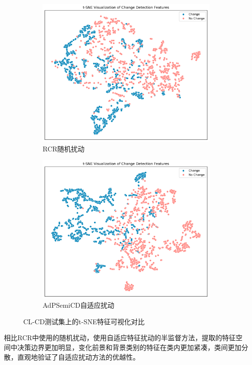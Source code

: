 \documentclass[lang=chs, degree=master, blindreview=false, adobe=false]{yanputhesis}
\begin{document}
\begin{figure}[H]
  \centering
  \hspace*{\fill} %
  \begin{subfigure}[t]{0.46\textwidth} %
      \centering
      \includegraphics[scale=0.36]{images/tsne_5RCRCl.png}
      \caption{RCR随机扰动}
      \label{fig:tsneCL_left}
  \end{subfigure}
  \hfill %
  \begin{subfigure}[t]{0.46\textwidth} %
      \centering
      \includegraphics[scale=0.36]{images/tsne_5AdPCl.png} %
      \caption{AdPSemiCD自适应扰动} %
      \label{fig:tsneCL_right}
  \end{subfigure}
  \hspace*{\fill} %
  \caption{CL-CD测试集上的t-SNE特征可视化对比}
  \label{fig:AdP_tsneCL}
\end{figure}
相比RCR中使用的随机扰动，使用自适应特征扰动的半监督方法，提取的特征空间中决策边界更加明显，变化前景和背景类别的特征在类内更加紧凑，类间更加分散，直观地验证了自适应扰动方法的优越性。
\end{document}
